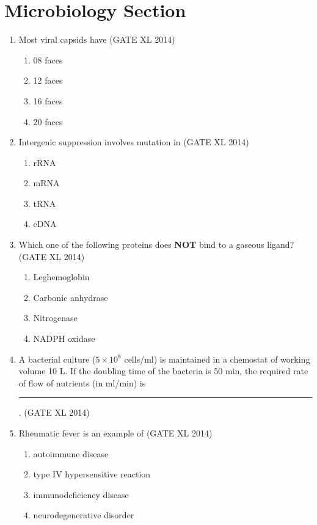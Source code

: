 \documentclass[journal,12pt,onecolumn]{IEEEtran}
\theoremstyle{remark}
\begin{document}
\section*{Microbiology Section}

\begin{enumerate}

\item Most viral capsids have 
\hfill(GATE XL 2014)
\begin{multicols}{2}
\begin{enumerate}
\item 08 faces
\item 12 faces
\item 16 faces
\item 20 faces
\end{enumerate}
\end{multicols}

\item Intergenic suppression involves mutation in \hfill(GATE XL 2014)
\begin{multicols}{2}
\begin{enumerate}
\item rRNA
\item mRNA
\item tRNA
\item cDNA
\end{enumerate}
\end{multicols}

\item Which one of the following proteins does \textbf{NOT} bind to a gaseous ligand? \hfill(GATE XL 2014)\\
\begin{multicols}{2}
\begin{enumerate}
\item Leghemoglobin
\item Carbonic anhydrase
\item Nitrogenase
\item NADPH oxidase
\end{enumerate}
\end{multicols}

\item A bacterial culture ($5 \times 10^8$ cells/ml) is maintained in a chemostat of working volume 10 L. If the doubling time of the bacteria is 50 min, the required rate of flow of nutrients (in ml/min) is \rule{2cm}{0.1pt}. \hfill(GATE XL 2014)\\

\item Rheumatic fever is an example of \hfill(GATE XL 2014)
\begin{multicols}{2}
\begin{enumerate}
\item autoimmune disease
\item type IV hypersensitive reaction
\item immunodeficiency disease
\item neurodegenerative disorder
\end{enumerate}
\end{multicols}


\end{enumerate}
\end{document}
